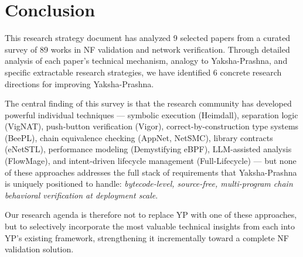 \documentclass[12pt, a4paper]{article}
\begin{document}
\section{Conclusion}
\label{sec:conclusion}

This research strategy document has analyzed 9 selected papers from a curated survey of 89 works in NF validation and network verification. Through detailed analysis of each paper's technical mechanism, analogy to Yaksha-Prashna, and specific extractable research strategies, we have identified 6 concrete research directions for improving Yaksha-Prashna.

The central finding of this survey is that the research community has developed powerful individual techniques --- symbolic execution (Heimdall), separation logic (VigNAT), push-button verification (Vigor), correct-by-construction type systems (BeePL), chain equivalence checking (AppNet, NetSMC), library contracts (eNetSTL), performance modeling (Demystifying eBPF), LLM-assisted analysis (FlowMage), and intent-driven lifecycle management (Full-Lifecycle) --- but none of these approaches addresses the full stack of requirements that Yaksha-Prashna is uniquely positioned to handle: \emph{bytecode-level, source-free, multi-program chain behavioral verification at deployment scale}.

Our research agenda is therefore not to replace YP with one of these approaches, but to selectively incorporate the most valuable technical insights from each into YP's existing framework, strengthening it incrementally toward a complete NF validation solution.

\end{document}
